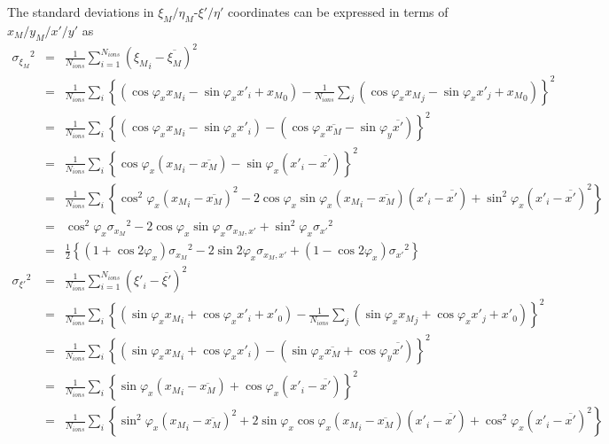 \documentclass{article}
\begin{document}
The standard deviations in $\xi_M/\eta_M$-$\xi'/\eta'$ coordinates can be expressed in terms of $x_M/y_M/x'/y'$ as
\begin{eqnarray*}
{\sigma_{\xi_M}}^2 & = & \frac{1}{N_{ions}} \sum_{i=1}^{N_{ions}} ({\xi_M}_i - \overline{\xi_M})^2 \\
& = & \frac{1}{N_{ions}} \sum_i \left\{ \left( \cos{\varphi_x} {x_M}_i - \sin{\varphi_x} {x'}_i + {x_M}_0 \right) - \frac{1}{N_{ions}}\sum_j \left( \cos{\varphi_x} {x_M}_j - \sin{\varphi_x} {x'}_j + {x_M}_0 \right) \right\}^2 \\
& = & \frac{1}{N_{ions}} \sum_i \left\{ \left( \cos{\varphi_x}{x_M}_i - \sin{\varphi_x}{x'}_i \right) - \left( \cos{\varphi_x}\overline{x_M} - \sin{\varphi_y}\overline{x'} \right) \right\}^2 \\
& = & \frac{1}{N_{ions}} \sum_i \left\{ \cos{\varphi_x} \left( {x_M}_i - \overline{x_M} \right) - \sin{\varphi_x} \left( {x'}_i - \overline{x'} \right) \right\}^2 \\
& = & \frac{1}{N_{ions}} \sum_i \left\{ \cos^2{\varphi_x} \left( {x_M}_i - \overline{x_M} \right)^2 - 2\cos{\varphi_x}\sin{\varphi_x} \left( {x_M}_i-\overline{x_M} \right) \left( {x'}_i-\overline{x'} \right) + \sin^2{\varphi_x}\left( {x'}_i - \overline{x'} \right)^2 \right\} \\
& = & \cos^2{\varphi_x} {\sigma_{x_M}}^2 -2\cos{\varphi_x}\sin{\varphi_x} \sigma_{x_M,x'} + \sin^2{\varphi_x} {\sigma_{x'}}^2 \\
& = & \frac{1}{2} \left\{ \left(1+\cos{2\varphi_x}\right) {\sigma_{x_M}}^2 - 2\sin{2\varphi_x}\sigma_{x_M,x'} + \left(1-\cos{2\varphi_x}\right) {\sigma_{x'}}^2 \right\} \\
{\sigma_{\xi'}}^2 & = & \frac{1}{N_{ions}} \sum_{i=1}^{N_{ions}} ({\xi'}_i - \overline{\xi'})^2 \\
& = & \frac{1}{N_{ions}} \sum_i \left\{ \left( \sin{\varphi_x} {x_M}_i + \cos{\varphi_x} {x'}_i + {x'}_0 \right) - \frac{1}{N_{ions}}\sum_j \left( \sin{\varphi_x} {x_M}_j + \cos{\varphi_x} {x'}_j + {x'}_0 \right) \right\}^2 \\
& = & \frac{1}{N_{ions}} \sum_i \left\{ \left( \sin{\varphi_x}{x_M}_i + \cos{\varphi_x}{x'}_i \right) - \left( \sin{\varphi_x}\overline{x_M} + \cos{\varphi_y}\overline{x'} \right) \right\}^2 \\
& = & \frac{1}{N_{ions}} \sum_i \left\{ \sin{\varphi_x} \left( {x_M}_i - \overline{x_M} \right) + \cos{\varphi_x} \left( {x'}_i - \overline{x'} \right) \right\}^2 \\
& = & \frac{1}{N_{ions}} \sum_i \left\{ \sin^2{\varphi_x} \left( {x_M}_i - \overline{x_M} \right)^2 + 2\sin{\varphi_x}\cos{\varphi_x} \left( {x_M}_i-\overline{x_M} \right) \left( {x'}_i-\overline{x'} \right) + \cos^2{\varphi_x}\left( {x'}_i - \overline{x'} \right)^2 \right\} \\

\end{eqnarray*}
\end{document}
